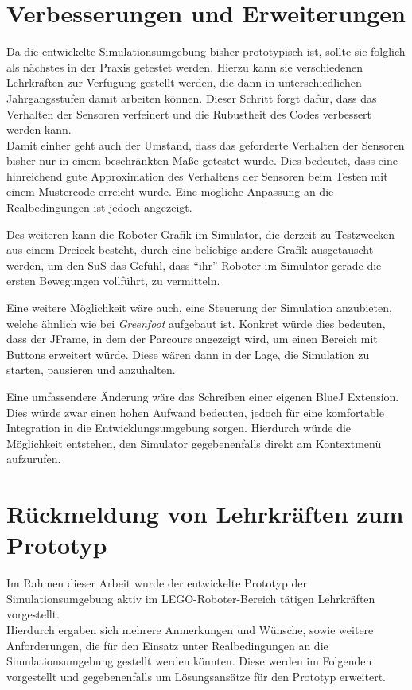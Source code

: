 \documentclass[paper=a4, DIV=calc, BCOR=12mm, twoside=on, onecolumn=on, open = right, titlepage =on, parskip =half-, headsepline = on, footsepline = off, chapterprefix = off, appendixprefix = on, fontsize = 12pt, numbers = noenddot, abstract = on]{scrbook}
\begin{document}
\section{Verbesserungen und Erweiterungen}

Da die entwickelte Simulationsumgebung bisher prototypisch ist, sollte sie folglich als nächstes in der Praxis getestet werden. Hierzu kann sie verschiedenen Lehrkräften zur Verfügung gestellt werden, die dann in unterschiedlichen Jahrgangsstufen damit arbeiten können. Dieser Schritt forgt dafür, dass das Verhalten der Sensoren verfeinert und die Rubustheit des Codes verbessert werden kann.\\
Damit einher geht auch der Umstand, dass das geforderte Verhalten der Sensoren bisher nur in einem beschränkten Maße getestet wurde. Dies bedeutet,
dass eine hinreichend gute Approximation des Verhaltens der Sensoren beim
Testen mit einem Mustercode erreicht wurde. Eine mögliche Anpassung an die Realbedingungen ist jedoch angezeigt.

Des weiteren kann die Roboter-Grafik im Simulator, die derzeit zu Testzwecken aus einem Dreieck besteht, durch eine beliebige andere Grafik ausgetauscht werden, um den SuS das Gefühl, dass "`ihr"' Roboter im Simulator gerade die ersten Bewegungen vollführt, zu vermitteln.

Eine weitere Möglichkeit wäre auch, eine Steuerung der Simulation anzubieten, welche ähnlich wie bei \emph{Greenfoot} aufgebaut ist. Konkret würde dies bedeuten, dass der JFrame, in dem der Parcours angezeigt wird, um einen Bereich mit Buttons erweitert würde. Diese wären dann in der Lage, die Simulation zu starten, pausieren und anzuhalten.

Eine umfassendere Änderung wäre das Schreiben einer eigenen BlueJ Extension. Dies würde zwar einen hohen Aufwand bedeuten, jedoch für eine komfortable Integration in die Entwicklungsumgebung sorgen. Hierdurch würde die Möglichkeit entstehen, den Simulator gegebenenfalls direkt am Kontextmenü aufzurufen.

\section{Rückmeldung von Lehrkräften zum Prototyp}

Im Rahmen dieser Arbeit wurde der entwickelte Prototyp der Simulationsumgebung aktiv im \textsc{LEGO}-Roboter-Bereich tätigen Lehrkräften vorgestellt.\\
Hierdurch ergaben sich mehrere Anmerkungen und Wünsche, sowie weitere Anforderungen, die für den Einsatz unter Realbedingungen an die Simulationsumgebung gestellt werden könnten. Diese werden im Folgenden vorgestellt und gegebenenfalls um Lösungsansätze für den Prototyp erweitert.
\end{document}
